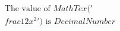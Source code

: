 \documentclass[preview]{standalone}
\begin{document}
\begin{align*}
\text{The value of } MathTex('\\frac{1}{2}x^2') \text{ is } DecimalNumber
\end{align*}
\end{document}
